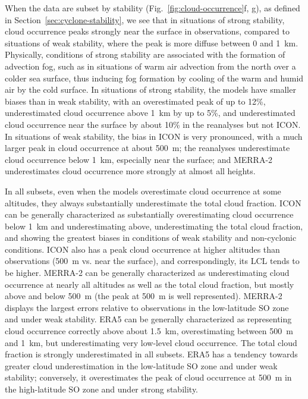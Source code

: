 \documentclass[draft]{agujournal2019}
\begin{document}
When the data are subset by stability (Fig.~\ref{fig:cloud-occurrence}f, g), as defined in Section~\ref{sec:cyclone-stability}, we see that in situations of strong stability, cloud occurrence peaks strongly near the surface in observations, compared to situations of weak stability, where the peak is more diffuse between 0 and 1~km. Physically, conditions of strong stability are associated with the formation of advection fog, such as in situations of warm air advection from the north over a colder sea surface, thus inducing fog formation by cooling of the warm and humid air by the cold surface. In situations of strong stability, the models have smaller biases than in weak stability, with an overestimated peak of up to 12\%, underestimated cloud occurrence above 1~km by up to 5\%, and underestimated cloud occurrence near the surface by about 10\% in the reanalyses but not ICON. In situations of weak stability, the bias in ICON is very pronounced, with a much larger peak in cloud occurrence at about 500~m; the reanalyses underestimate cloud occurrence below 1~km, especially near the surface; and MERRA-2 underestimates cloud occurrence more strongly at almost all heights.

In all subsets, even when the models overestimate cloud occurrence at some altitudes, they always substantially underestimate the total cloud fraction. ICON can be generally characterized as substantially overestimating cloud occurrence below 1~km and underestimating above, underestimating the total cloud fraction, and showing the greatest biases in conditions of weak stability and non-cyclonic conditions. ICON also has a peak cloud occurrence at higher altitudes than observations (500~m vs. near the surface), and correspondingly, its LCL tends to be higher. MERRA-2 can be generally characterized as underestimating cloud occurrence at nearly all altitudes as well as the total cloud fraction, but mostly above and below 500~m (the peak at 500~m is well represented). MERRA-2 displays the largest errors relative to observations in the low-latitude SO zone and under weak stability. ERA5 can be generally characterized as representing cloud occurrence correctly above about 1.5~km, overestimating between 500~m and 1~km, but underestimating very low-level cloud occurrence. The total cloud fraction is strongly underestimated in all subsets. ERA5 has a tendency towards greater cloud underestimation in the low-latitude SO zone and under weak stability; conversely, it overestimates the peak of cloud occurrence at 500~m in the high-latitude SO zone and under strong stability.
\end{document}

